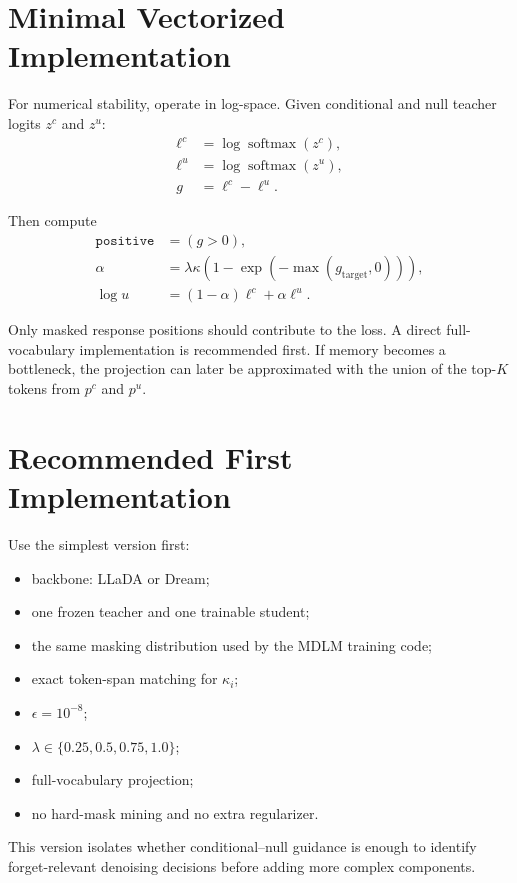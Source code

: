 \documentclass[10pt]{article}
\begin{document}
\section{Minimal Vectorized Implementation}

For numerical stability, operate in log-space. Given conditional and null
teacher logits $z^c$ and $z^u$:
\begin{align}
\ell^c &= \log\operatorname{softmax}(z^c),\\
\ell^u &= \log\operatorname{softmax}(z^u),\\
g &= \ell^c-\ell^u.
\end{align}

Then compute
\begin{align}
\texttt{positive} &= (g>0),\\
\alpha &= \lambda\kappa
\left(1-\exp(-\max(g_{\mathrm{target}},0))\right),\\
\log u &= (1-\alpha)\ell^c+\alpha\ell^u.
\end{align}

Only masked response positions should contribute to the loss. A direct
full-vocabulary implementation is recommended first. If memory becomes a
bottleneck, the projection can later be approximated with the union of the
top-$K$ tokens from $p^c$ and $p^u$.

\section{Recommended First Implementation}

Use the simplest version first:
\begin{itemize}[leftmargin=1.5em]
    \item backbone: LLaDA or Dream;
    \item one frozen teacher and one trainable student;
    \item the same masking distribution used by the MDLM training code;
    \item exact token-span matching for $\kappa_i$;
    \item $\epsilon=10^{-8}$;
    \item $\lambda\in\{0.25,0.5,0.75,1.0\}$;
    \item full-vocabulary projection;
    \item no hard-mask mining and no extra regularizer.
\end{itemize}

This version isolates whether conditional--null guidance is enough to identify
forget-relevant denoising decisions before adding more complex components.
\end{document}
